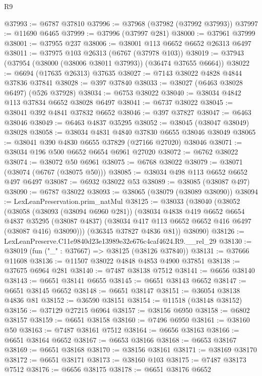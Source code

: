 \begin{lexlean}{R9}
\begin{coremodule}
@37993 := @6787 @37810
@37996 := @37968 (@37982 (@37992 @37993))
@37997 := @11690 @6465
@37999 := @37996 (@37997 @281)
@38000 := @37961 @37999
@38001 := @37955 @237
@38006 := @38001 @113 @6652 @6652 @26313 @6497
@38011 := @37975 @103 @26313 (@6767 (@37978 @103))
@38019 := @37943 (@37954 (@38000 (@38006 @38011 @37993)) (@36474 @37655 @6664))
@38022 := @6694 (@17635 @26313) @37635
@38027 := @7143 @38022 @4828 @4844 @37836 @37841
@38028 := @397 @37840
@38033 := @38027 (@6463 @38028 @6497) (@526 @37928)
@38034 := @6753 @38022
@38040 := @38034 @4842 @113 @37834 @6652 @38028 @6497
@38041 := @6737 @38022
@38045 := @38041 @392 @4841 @37832 @6652
@38046 := @397 @37827
@38047 := @6463 @38046
@38049 := @6463 @4837 @35295
@38052 := @38045 (@38047 @38049) @38028
@38058 := @38034 @4831 @4840 @37830 @6655 @38046 @38049
@38065 := @38041 @390 @4830 @6655 @37829 (@27166 @27020) @38046
@38071 := @38034 @196 @500 @6652 @6654 @6961 @27020
@38072 := @6762 @38022
@38074 := @38072 @50 @6961
@38075 := @6768 @38022
@38079 := @38071 (@38074 (@6767 (@38075 @50)))
@38085 := @38034 @498 @113 @6652 @6652 @497 @6497
@38087 := @6932 @38022 @53
@38089 := @38085 (@38087 @497)
@38090 := @6787 @38022
@38093 := @38065 (@38079 (@38089 @38090))
@38094 := LexLeanPreservation.prim_natMul
@38125 := @38033
    (@38040
      (@38052
        (@38058
          (@38093 (@38094 @6960 @281))
          (@38034
            @4838
            @419
            @6652
            @6654
            @4837
            @35295
            (@38087 @4837)
            (@38034 @417 @113 @6652 @6652 @416 @6497 (@38087 @416) @38090)))
        (@36345 @37827 @4836 @81))
      @38090)
@38126 := LexLeanPreserve.C11e9840d23e13989e32e676c4caf4624.R9.__rel_29
@38130 := @38019 (fun ("_" : @37667) => @38125 (@38126 @37840))
@38131 := @37666 @11608
@38136 := @11507 @38022 @4848 @4853 @4900 @37851
@38138 := @37675 @6964 @281
@38140 := @7487 @38138 @7512
@38141 := @6656 @38140
@38143 := @6651 @38141 @6655
@38145 := @6651 @38143 @6652
@38147 := @6651 @38145 @6652
@38148 := @6651 @38147
@38151 := @36054 @38138 @4836 @81
@38152 := @36590 @38151
@38154 := @11518 (@38148 @38152)
@38156 := @37129 @27215 @6964
@38157 := @38156 @6950
@38158 := @6802 @38157
@38159 := @6651 @38158
@38160 := @7496 @6950
@38161 := @38160 @50
@38163 := @7487 @38161 @7512
@38164 := @6656 @38163
@38166 := @6651 @38164 @6652
@38167 := @6653 @38166
@38168 := @6653 @38167
@38169 := @6651 @38168
@38170 := @38156 @38161
@38171 := @38169 @38170
@38172 := @6651 @38171
@38173 := @38160 @103
@38175 := @7487 @38173 @7512
@38176 := @6656 @38175
@38178 := @6651 @38176 @6652

\end{coremodule}
\end{lexlean}

